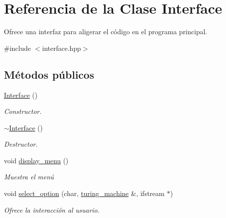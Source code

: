 \hypertarget{class_interface}{}\section{Referencia de la Clase Interface}
\label{class_interface}


Ofrece una interfaz para aligerar el código en el programa principal.  




{\ttfamily \#include $<$interface.\+hpp$>$}

\subsection*{Métodos públicos}
\begin{DoxyCompactItemize}
\item 
\hypertarget{class_interface_a4406d74c75bdfe150bf72be1f1cda8b1}{}\hyperlink{class_interface_a4406d74c75bdfe150bf72be1f1cda8b1}{Interface} ()\label{class_interface_a4406d74c75bdfe150bf72be1f1cda8b1}

\begin{DoxyCompactList}\small\item\em Constructor. \end{DoxyCompactList}\item 
\hypertarget{class_interface_a19179888f29f18f1be54a3dfe98f68c0}{}\hyperlink{class_interface_a19179888f29f18f1be54a3dfe98f68c0}{$\sim$\+Interface} ()\label{class_interface_a19179888f29f18f1be54a3dfe98f68c0}

\begin{DoxyCompactList}\small\item\em Destructor. \end{DoxyCompactList}\item 
\hypertarget{class_interface_a7512767311df1e29287bbc097d7b43c1}{}void \hyperlink{class_interface_a7512767311df1e29287bbc097d7b43c1}{display\+\_\+menu} ()\label{class_interface_a7512767311df1e29287bbc097d7b43c1}

\begin{DoxyCompactList}\small\item\em Muestra el menú \end{DoxyCompactList}\item 
void \hyperlink{class_interface_a7080d1f2814163f9177874bbba9191dc}{select\+\_\+option} (char, \hyperlink{classturing__machine}{turing\+\_\+machine} \&, ifstream $\ast$)
\begin{DoxyCompactList}\small\item\em Ofrece la interacción al usuario. \end{DoxyCompactList}\end{DoxyCompactItemize}


